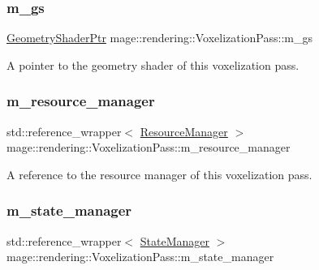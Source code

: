 \subsubsection{\texorpdfstring{m\+\_\+gs}{m\_gs}}
{\footnotesize\ttfamily \hyperlink{namespacemage_1_1rendering_aa5d63f80f9483d0896718813768ba1cf}{Geometry\+Shader\+Ptr} mage\+::rendering\+::\+Voxelization\+Pass\+::m\+\_\+gs\hspace{0.3cm}{\ttfamily [private]}}

A pointer to the geometry shader of this voxelization pass. \hypertarget{classmage_1_1rendering_1_1_voxelization_pass_aadfa94217df7498078ae49effc6b438b}{}\label{classmage_1_1rendering_1_1_voxelization_pass_aadfa94217df7498078ae49effc6b438b} 
\subsubsection{\texorpdfstring{m\+\_\+resource\+\_\+manager}{m\_resource\_manager}}
{\footnotesize\ttfamily std\+::reference\+\_\+wrapper$<$ \hyperlink{classmage_1_1rendering_1_1_resource_manager}{Resource\+Manager} $>$ mage\+::rendering\+::\+Voxelization\+Pass\+::m\+\_\+resource\+\_\+manager\hspace{0.3cm}{\ttfamily [private]}}

A reference to the resource manager of this voxelization pass. \hypertarget{classmage_1_1rendering_1_1_voxelization_pass_a449470bf0e0a246a2457b87289155330}{}\label{classmage_1_1rendering_1_1_voxelization_pass_a449470bf0e0a246a2457b87289155330} 
\subsubsection{\texorpdfstring{m\+\_\+state\+\_\+manager}{m\_state\_manager}}
{\footnotesize\ttfamily std\+::reference\+\_\+wrapper$<$ \hyperlink{classmage_1_1rendering_1_1_state_manager}{State\+Manager} $>$ mage\+::rendering\+::\+Voxelization\+Pass\+::m\+\_\+state\+\_\+manager\hspace{0.3cm}{\ttfamily [private]}}

